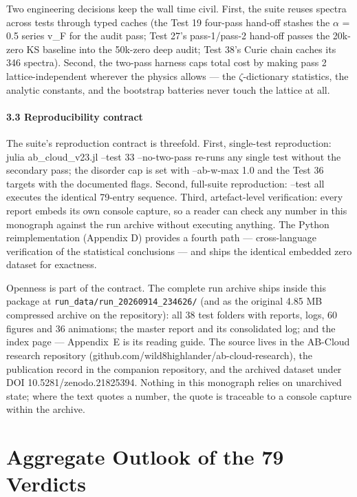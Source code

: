\documentclass[10pt]{article}
\begin{document}
Two engineering decisions keep the wall time civil. First, the suite reuses spectra across tests through typed caches (the Test 19 four-pass hand-off stashes the $\alpha$ = 0.5 series v\_F for the audit pass; Test 27's pass-1/pass-2 hand-off passes the 20k-zero KS baseline into the 50k-zero deep audit; Test 38's Curie chain caches its 346 spectra). Second, the two-pass harness caps total cost by making pass 2 lattice-independent wherever the physics allows --- the $\zeta$-dictionary statistics, the analytic constants, and the bootstrap batteries never touch the lattice at all.

\paragraph{3.3 Reproducibility contract}

The suite's reproduction contract is threefold. First, single-test reproduction: julia ab\_cloud\_v23.jl --test 33 --no-two-pass re-runs any single test without the secondary pass; the disorder cap is set with --ab-w-max 1.0 and the Test 36 targets with the documented flags. Second, full-suite reproduction: --test all executes the identical 79-entry sequence. Third, artefact-level verification: every report embeds its own console capture, so a reader can check any number in this monograph against the run archive without executing anything. The Python reimplementation (Appendix D) provides a fourth path --- cross-language verification of the statistical conclusions --- and ships the identical embedded zero dataset for exactness.

Openness is part of the contract. The complete run archive ships inside this package at \texttt{run\_data/run\_20260914\_234626/} (and as the original 4.85 MB compressed archive on the repository): all 38 test folders with reports, logs, 60 figures and 36 animations; the master report and its consolidated log; and the index page --- Appendix~E is its reading guide. The source lives in the AB-Cloud research repository (github.com/wild8highlander/ab-cloud-research), the publication record in the companion repository, and the archived dataset under DOI 10.5281/zenodo.21825394. Nothing in this monograph relies on unarchived state; where the text quotes a number, the quote is traceable to a console capture within the archive.

\section{Aggregate Outlook of the 79 Verdicts}
\end{document}
